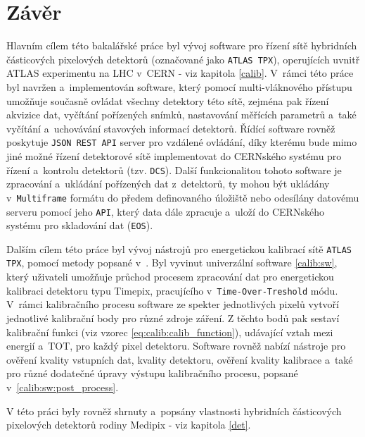 

\chapter{Závěr}
Hlavním cílem této bakalářské práce byl vývoj software pro řízení sítě hybridních částicových pixelových detektorů (označované jako \texttt{ATLAS TPX}), operujících uvnitř ATLAS experimentu na LHC v~CERN - viz kapitola \ref{calib}. V~rámci této práce byl navržen a~implementován software, který pomocí multi-vláknového přístupu umožňuje současně ovládat všechny detektory této sítě, zejména pak řízení akvizice dat, vyčítání pořízených snímků, nastavování měřících parametrů a~také vyčítání a~uchovávání stavových informací detektorů. Řídící software rovněž poskytuje \texttt{JSON REST API} server pro vzdálené ovládání, díky kterému bude mimo jiné možné řízení detektorové sítě implementovat do CERNského systému pro řízení a~kontrolu detektorů (tzv. \texttt{DCS}). Další funkcionalitou tohoto software je zpracování a~ukládání pořízených dat z~detektorů, ty mohou být ukládány v~\texttt{Multiframe} formátu do předem definovaného úložiště nebo odesílány datovému serveru pomocí jeho \texttt{API}, který data dále zpracuje a~uloží do CERNského systému pro skladování dat (\texttt{EOS}).

Dalším cílem této práce byl vývoj nástrojů pro energetickou kalibrací sítě \texttt{ATLAS TPX}, pomocí metody popsané v~\cite{Jakubek2011S262}. Byl vyvinut univerzální software \ref{calib:sw}, který uživateli umožňuje průchod procesem zpracování dat pro energetickou kalibraci detektoru typu Timepix, pracujícího v~\texttt{Time-Over-Treshold} módu. V~rámci kalibračního procesu software ze spekter jednotlivých pixelů vytvoří jednotlivé kalibrační body pro různé zdroje záření. Z těchto bodů pak sestaví kalibrační funkci (viz vzorec \ref{eq:calib:calib_function}), udávající vztah mezi energií a~TOT, pro každý pixel detektoru. Software rovněž nabízí nástroje pro ověření kvality vstupních dat, kvality detektoru, ověření kvality kalibrace a~také pro různé dodatečné úpravy výstupu kalibračního procesu, popsané v~\ref{calib:sw:post_process}.

V této práci byly rovněž shrnuty a~popsány vlastnosti hybridních částicových pixelových detektorů rodiny Medipix - viz kapitola \ref{det}.